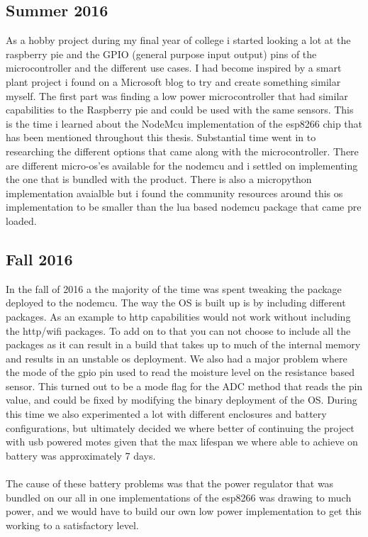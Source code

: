 \documentclass[]{uiophd}
\begin{document}
\subsection{Summer 2016}
As a hobby project during my final year of college i started looking a lot at the raspberry pie and the GPIO (general purpose input output) pins of the microcontroller and the different use cases. I had become inspired by a smart plant project i found on a Microsoft blog to try and create something similar myself. The first part was finding a low power microcontroller that had similar capabilities to the Raspberry pie and could be used with the same sensors. This is the time i learned about the NodeMcu implementation of the esp8266 chip that has been mentioned throughout this thesis. Substantial time went in to researching the different options that came along with the microcontroller. There are different micro-os'es available for the nodemcu and i settled on implementing the one that is bundled with the product. There is also a micropython implementation avaialble but i found the community resources around this os implementation to be smaller than the lua based nodemcu package that came pre loaded.
\subsection{Fall 2016}
In the fall of 2016 a the majority of the time was spent tweaking the package deployed to the nodemcu. The way the OS is built up is by including different packages. As an example to http capabilities would not work without including the http/wifi packages. To add on to that you can not choose to include all the packages as it can result in a build that takes up to much of the internal memory and results in an unstable os deployment. We also had a major problem where the mode of the gpio pin used to read the moisture level on the resistance based sensor. This turned out to be a mode flag for the ADC method that reads the pin value, and could be fixed by modifying the binary deployment of the OS. During this time we also experimented a lot with different enclosures and battery configurations, but ultimately decided we where better of continuing the project with usb powered motes given that the max lifespan we where able to achieve on battery was approximately 7 days.
\\\\
The cause of these battery problems was that the power regulator that was bundled on our all in one implementations of the esp8266 was drawing to much power, and we would have to build our own low power implementation to get this working to a satisfactory level.
\end{document}
